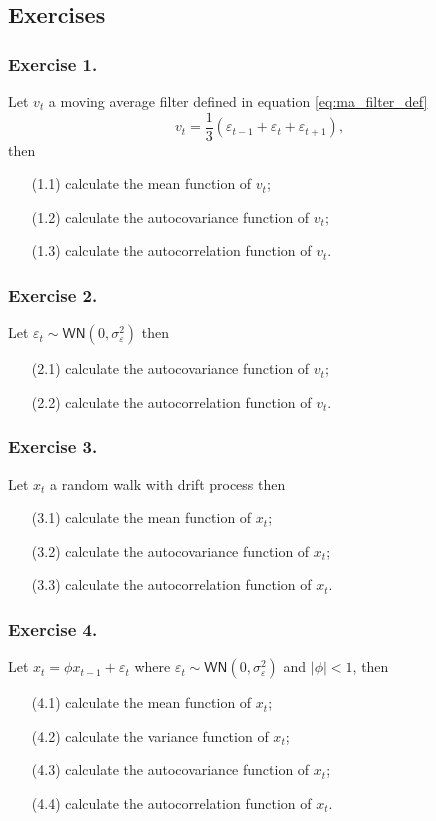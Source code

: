 \documentclass[
paper=128mm:96mm, %
fontsize=9.5pt, %
pagesize, %
parskip=half-, %
]{scrartcl} %
\theoremstyle{mythmstyle} %
\begin{document}
\subsection{Exercises}

\subsubsection*{Exercise 1.}
Let $v_t$ a moving average filter defined in equation \eqref{eq:ma_filter_def}
%
\begin{equation}
v_t=\frac{1}{3}\left(\varepsilon_{t-1}+\varepsilon_t+\varepsilon_{t+1}\right),\nonumber
\end{equation}
then
\begin{itemize}
\item[(1.1)] calculate the mean function of $v_t$;
\item[(1.2)] calculate the autocovariance function of $v_t$;
\item[(1.3)] calculate the autocorrelation function of $v_t$.
\end{itemize}

\subsubsection*{Exercise 2.}
Let $\varepsilon_{t}\sim\mathsf{WN}\left(0,\sigma^2_\varepsilon\right)$ 
%
then
\begin{itemize}
\item[(2.1)] calculate the autocovariance function of $v_t$;
\item[(2.2)] calculate the autocorrelation function of $v_t$.
\end{itemize}


\subsubsection*{Exercise 3.}
Let $x_t$ a random walk with drift process
%
then
\begin{itemize}
\item[(3.1)] calculate the mean function of $x_t$;
\item[(3.2)] calculate the autocovariance function of $x_t$;
\item[(3.3)] calculate the autocorrelation function of $x_t$.
\end{itemize}

\subsubsection*{Exercise 4.}
Let $x_t=\phi x_{t-1}+\varepsilon_{t}$ where $\varepsilon_{t}\sim\mathsf{WN}\left(0,\sigma^2_\varepsilon\right)$ and $\vert\phi\vert<1$,
%
then
\begin{itemize}
\item[(4.1)] calculate the mean function of $x_t$;
\item[(4.2)] calculate the variance function of $x_t$;
\item[(4.3)] calculate the autocovariance function of $x_t$;
\item[(4.4)] calculate the autocorrelation function of $x_t$.
\end{itemize}
\end{document}
